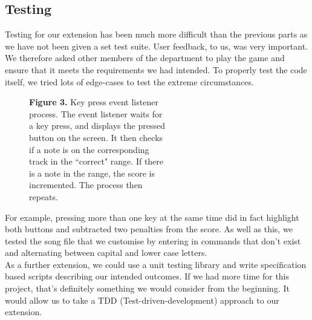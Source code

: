 \documentclass[11pt]{article}
\begin{document}
\subsection{Testing}

Testing for our extension has been much more difficult than the previous parts as we have not been given a set test suite. User feedback, to us, was very important. We therefore asked other members of the department to play the game and ensure that it meets the requirements we had intended. To properly test the code itself, we tried lots of edge-cases to test the extreme circumstances.

\newpage

\begin{figure}
  \vspace{-1em}
  \hspace*{4em}
  \raggedright
  
  \setlength{\belowcaptionskip}{-4em}
  \captionsetup{justification=justified,singlelinecheck=false}
  \caption*{\hspace*{1.9em}\fontsize{9}{9}\selectfont \textbf{Figure 3.} Key press event listener \\\hspace*{2.2em}process. The event listener waits for \\\hspace*{2.2em}a key press, and displays the pressed \\\hspace*{2.2em}button on the screen. It then checks\\\hspace*{2.2em}if a note is on the corresponding\\\hspace*{2.2em}track in the ``correct" range. If there\\\hspace*{2.2em}is a note in the range, the score is \\\hspace*{2.2em}incremented. The process then\\\hspace*{2.2em}repeats.}
\end{figure}

For example, pressing more than one key at the same time did in fact highlight both buttons and subtracted two penalties from the score. As well as this, we tested the song file that we customise by entering in commands that don't exist and alternating between capital and lower case letters.
\\
As a further extension, we could use a unit testing library and write specification based scripts describing our intended outcomes. If we had more time for this project, that's definitely something we would consider from the beginning. It would allow us to take a TDD (Test-driven-development) approach to our extension.
\end{document}
